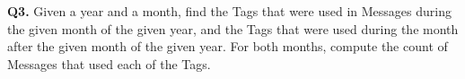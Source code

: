 \textbf{Q3.}
Given a year and a month, find the Tags that were used in Messages
during the given month of the given year, and the Tags that were used
during the month after the given month of the given year.
For both months, compute the count of Messages that used each of the
Tags.
